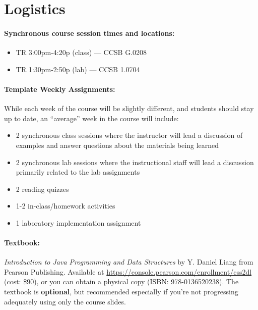 \documentclass[12pt]{scrartcl}
\begin{document}
\clearpage
\tableofcontents

\section{Logistics}
\paragraph{Synchronous course session times and locations:}
\begin{itemize}
\item TR 3:00pm-4:20p (class) --- CCSB G.0208
\item TR 1:30pm-2:50p (lab) --- CCSB 1.0704
\end{itemize}

\paragraph{Template Weekly Assignments:} While each week of the course will be slightly different, and students should stay up to date, an ``average'' week in the course will include:
\begin{itemize}
\item 2 synchronous class sessions where the instructor will lead a discussion of examples and answer questions about the materials being learned
\item 2 synchronous lab sessions where the  instructional staff will lead a discussion primarily related to the lab assignments
\item 2 reading quizzes
\item 1-2 in-class/homework activities
\item 1 laboratory implementation assignment
\end{itemize}

\paragraph{Textbook:} \textit{Introduction to Java Programming and Data Structures} by Y. Daniel Liang from Pearson Publishing. 
Available at \url{https://console.pearson.com/enrollment/css2dl}  (cost: \$90), 
or you can obtain a physical copy (ISBN: 978-0136520238). 
The textbook is \textbf{optional}, but recommended especially if you're not progressing adequately using only the course slides. 
\end{document}
